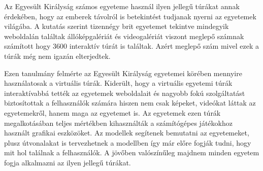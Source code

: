 Az Egyesült Királyság \cite{maines2015application} számos egyeteme használ ilyen jellegű túrákat annak érdekében, hogy az emberek távolról is betekintést tudjanak nyerni az egyetemek világába. A kutatás szerint tizennégy brit egyetemet tekintve mindegyik weboldalán találtak állóképgalériát és videogalériát viszont meglepő számnak számított hogy 3600 interaktív túrát is találtak. Azért meglepő szám mivel ezek a túrák még nem igazán elterjedtek.

Ezen tanulmány felmérte az Egyesült Királyság egyetemei körében mennyire használatosak a virtuális túrák. Kiderült, hogy a virtuális egyetemi túrák interaktívabbá tették az egyetemek weboldalait és nagyobb fokú szolgáltatást biztosítottak a felhasználók számára hiszen nem csak képeket, videókat láttak az egyetemekről, hanem maga az egyetemet is. Az egyetemek ezen túrák megalkotásában teljes mértékben kihasználták  a számítógépes játékokhoz használt grafikai eszközöket. Az modellek segítenek bemutatni az egyetemeket, plusz útvonalakat is tervezhetnek a modellben így már előre fogják tudni, hogy mit hol találnak a felhasználók. A jövőben valószínűleg majdnem minden egyetem fogja alkalmazni az ilyen jellegű túrákat.
